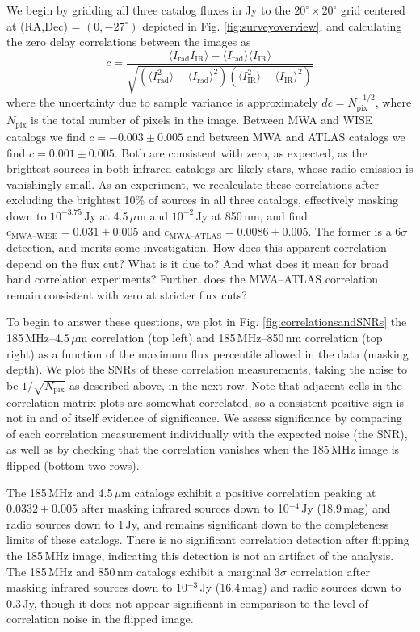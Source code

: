 \documentclass{emulateapj}
\newcommand{\rad}{\text{rad}}
\newcommand{\IR}{\text{IR}}
\begin{document}
We begin by gridding all three catalog fluxes in Jy to the $20^\circ\times20^\circ$ grid centered at (RA,Dec) = $(0, -27^\circ)$ depicted in Fig. \ref{fig:surveyoverview}, and calculating the zero delay correlations between the images as
\begin{equation}
\label{eqn:imagecorrdef}
	c = \frac{\langle I_\rad I_\IR\rangle-\langle I_\rad\rangle\langle I_\IR\rangle}{\sqrt{(\langle I_\rad^2\rangle -\langle I_\rad\rangle^2)(\langle I_\IR^2\rangle -\langle I_\IR\rangle^2)}}
\end{equation}
where the uncertainty due to sample variance is approximately $dc=N_\text{pix}^{-1/2}$, where $N_\text{pix}$ is the total number of pixels in the image. Between MWA and WISE catalogs we find $c=-0.003\pm0.005$ and between MWA and ATLAS catalogs we find $c=0.001\pm0.005$. Both are consistent with zero, as expected, as the brightest sources in both infrared catalogs are likely stars, whose radio emission is vanishingly small. As an experiment, we recalculate these correlations after excluding the brightest 10\% of sources in all three catalogs, effectively masking down to $10^{-3.75}$\,Jy at 4.5\,$\mu$m and $10^{-2}$\,Jy at 850\,nm, and find $c_\text{MWA--WISE}=0.031\pm0.005$ and $c_\text{MWA--ATLAS}=0.0086\pm0.005$. The former is a $6\sigma$ detection, and merits some investigation. How does this apparent correlation depend on the flux cut? What is it due to? And what does it mean for broad band correlation experiments? Further, does the MWA--ATLAS correlation remain consistent with zero at stricter flux cuts?

To begin to answer these questions, we plot in Fig. \ref{fig:correlationsandSNRs} the 185\,MHz--4.5\,$\mu$m correlation (top left) and 185\,MHz--850\,nm correlation (top right) as a function of the maximum flux percentile allowed in the data (masking depth). We plot the SNRs of these correlation measurements, taking the noise to be $1/\sqrt{N_\text{pix}}$ as described above, in the next row. Note that adjacent cells in the correlation matrix plots are somewhat correlated, so a consistent positive sign is not in and of itself evidence of significance. We assess significance by comparing of each correlation measurement individually with the expected noise (the SNR), as well as by checking that the correlation vanishes when the 185\,MHz image is flipped (bottom two rows).

The 185\,MHz and 4.5\,$\mu$m catalogs exhibit a positive correlation peaking at $0.0332\pm0.005$ after masking infrared sources down to 10$^{-4}$\,Jy (18.9\,mag) and radio sources down to 1\,Jy, and remains significant down to the completeness limits of these catalogs. There is no significant correlation detection after flipping the 185\,MHz image, indicating this detection is not an artifact of the analysis. The 185\,MHz and 850\,nm catalogs exhibit a marginal $3\sigma$ correlation after masking infrared sources down to 10$^{-3}$\,Jy (16.4\,mag) and radio sources down to 0.3\,Jy, though it does not appear significant in comparison to the level of correlation noise in the flipped image.
\end{document}
